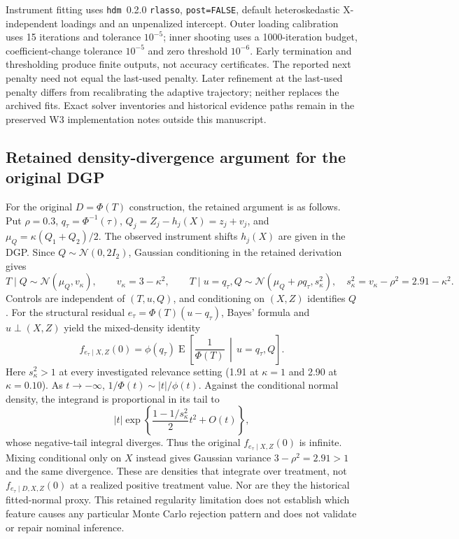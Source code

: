 Instrument fitting uses \texttt{hdm}~0.2.0 \texttt{rlasso}, \texttt{post=FALSE}, default heteroskedastic X-independent loadings and an unpenalized intercept. Outer loading calibration uses 15 iterations and tolerance $10^{-5}$; inner shooting uses a 1000-iteration budget, coefficient-change tolerance $10^{-5}$ and zero threshold $10^{-6}$. Early termination and thresholding produce finite outputs, not accuracy certificates. The reported next penalty need not equal the last-used penalty. Later refinement at the last-used penalty differs from recalibrating the adaptive trajectory; neither replaces the archived fits. Exact solver inventories and historical evidence paths remain in the preserved W3 implementation notes outside this manuscript.

\subsection{Retained density-divergence argument for the original DGP}
\label{app:density-divergence}
For the original $D=\Phi(T)$ construction, the retained argument is as follows. Put $\rho=0.3$, $q_\tau=\Phi^{-1}(\tau)$, $Q_j=Z_j-h_j(X)=z_j+v_j$, and $\mu_Q=\kappa(Q_1+Q_2)/2$. The observed instrument shifts $h_j(X)$ are given in the DGP. Since $Q\sim\mathcal N(0,2I_2)$, Gaussian conditioning in the retained derivation gives
\[
 T\mid Q\sim\mathcal N(\mu_Q,v_\kappa),\qquad v_\kappa=3-\kappa^2,
 \qquad
 T\mid u=q_\tau,Q\sim\mathcal N(\mu_Q+\rho q_\tau,s_\kappa^2),\quad
 s_\kappa^2=v_\kappa-\rho^2=2.91-\kappa^2.
\]
Controls are independent of $(T,u,Q)$, and conditioning on $(X,Z)$ identifies $Q$. For the structural residual $e_\tau=\Phi(T)(u-q_\tau)$, Bayes' formula and $u\perp(X,Z)$ yield the mixed-density identity
\begin{equation}
 f_{e_\tau\mid X,Z}(0)
 =\phi(q_\tau)\operatorname E\!\left[\frac{1}{\Phi(T)}\,\middle|\,u=q_\tau,Q\right].
 \label{eq:mixed-density-divergence}
\end{equation}
Here $s_\kappa^2>1$ at every investigated relevance setting (1.91 at $\kappa=1$ and 2.90 at $\kappa=0.10$). As $t\to-\infty$, $1/\Phi(t)\sim |t|/\phi(t)$. Against the conditional normal density, the integrand is proportional in its tail to
\[
 |t|\exp\!\left\{\frac{1-1/s_\kappa^2}{2}t^2+O(t)\right\},
\]
whose negative-tail integral diverges. Thus the original $f_{e_\tau\mid X,Z}(0)$ is infinite. Mixing conditional only on $X$ instead gives Gaussian variance $3-\rho^2=2.91>1$ and the same divergence. These are densities that integrate over treatment, not $f_{e_\tau\mid D,X,Z}(0)$ at a realized positive treatment value. Nor are they the historical fitted-normal proxy. This retained regularity limitation does not establish which feature causes any particular Monte Carlo rejection pattern and does not validate or repair nominal inference.

